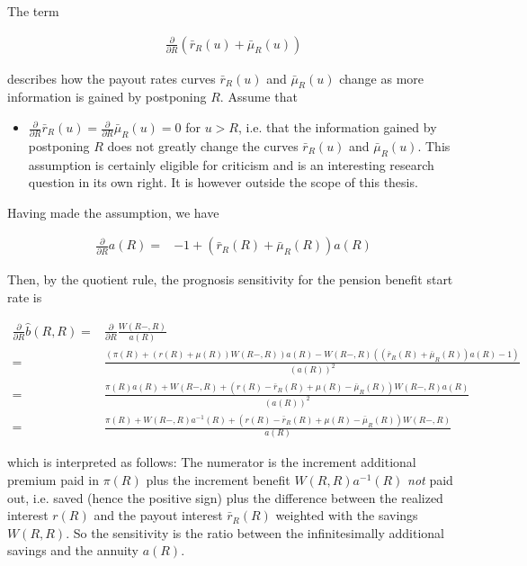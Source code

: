 \documentclass{article}
\newcommand{\1}[1]{\mathbbm{1}_{\left\lbrace #1 \right\rbrace}}
\theoremstyle{break}
\theoremstyle{remark}
\numberwithin{equation}{section}
\begin{document}
The term

\begin{align*}
	\frac{\partial}{\partial R} \left(\bar{r}_R(u)+\bar{\mu}_R(u)\right)
\end{align*}

describes how the payout rates curves $\bar{r}_R(u)$ and $\bar{\mu}_R(u)$ change as more information is gained by postponing $R$. Assume that

\begin{itemize}
	\item $\frac{\partial}{\partial R} \bar{r}_R(u) = \frac{\partial}{\partial R} \bar{\mu}_R(u) = 0$ for $u > R$, i.e. that the information gained by postponing $R$ does not greatly change the curves $\bar{r}_R(u)$ and $\bar{\mu}_R(u)$. This assumption is certainly eligible for criticism and is an interesting research question in its own right. It is however outside the scope of this thesis.
\end{itemize}

Having made the assumption, we have

\begin{align*}
	\frac{\partial}{\partial R} a(R) =& - 1 +  \left(\bar{r}_R(R)+\bar{\mu}_R(R)\right) a(R)
\end{align*}

Then, by the quotient rule, the prognosis sensitivity for the pension benefit start rate is

\begin{align*}
	\frac{\partial}{\partial R} \hat{b}(R,R) =& \frac{\partial}{\partial R} \frac{W(R-,R)}{a(R)} \\
	=& \frac{\left( \pi(R) + \left(r(R) + \mu(R)\right) W(R-,R) \right) a(R) - W(R-,R) \left( \left(\bar{r}_R(R) + \bar{\mu}_R(R)\right) a(R) - 1 \right)}{\left( a(R) \right)^2} \\
	=& \frac{\pi(R) a(R)  + W(R-,R) + \left( r(R) - \bar{r}_R(R) + \mu(R) - \bar{\mu}_R(R) \right) W(R-,R) a(R)}{\left( a(R) \right)^2} \\
	=& \frac{\pi(R)  + W(R-,R) a^{-1}(R) + \left( r(R) - \bar{r}_R(R) + \mu(R) - \bar{\mu}_R(R) \right) W(R-,R)}{ a(R) }
\end{align*}

which is interpreted as follows: The numerator is the increment additional premium paid in $\pi(R)$ plus the increment benefit $W(R,R) a^{-1}(R)$ \textit{not} paid out, i.e. saved (hence the positive sign) plus the difference between the realized interest $r(R)$ and the payout interest $\bar{r}_R(R)$ weighted with the savings $W(R,R)$. So the sensitivity is the ratio between the infinitesimally additional savings and the annuity $a(R)$.
\end{document}
